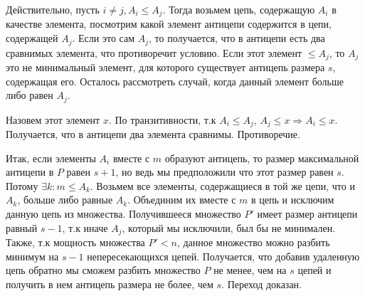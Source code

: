 {    Действительно, пусть $i \neq j, A_i \le A_j$. Тогда возьмем цепь, содержащую $A_i$ в качестве элемента, посмотрим какой элемент антицепи содержится в цепи, содержащей $A_j$. Если это сам $A_j$, то получается, что в антицепи есть два сравнимых элемента, что противоречит условию. Если этот элемент $\le A_j$, то $A_j$ это не минимальный элемент, для которого существует антицепь размера $s$, содержащая его. Осталось рассмотреть случай, когда данный элемент больше либо равен $A_j$.

    Назовем этот элемент $x$. По транзитивности, т.к $A_i \le A_j$, $A_j \le x \Rightarrow A_i \le x$. Получается, что в антицепи два элемента сравнимы. Противоречие.

    Итак, если элементы $A_i$ вместе с $m$ образуют антицепь, то размер максимальной антицепи в $P$ равен $s + 1$, но ведь мы предположили что этот размер равен $s$. Потому $\exists k: m \le A_k$. Возьмем все элементы, содержащиеся в той же цепи, что и $A_k$, больше либо равные $A_k$. Объединим их вместе с $m$ в цепь и исключим данную цепь из множества. Получившееся множество $P'$ имеет размер антицепи равный $s - 1$, т.к иначе $A_j$, который мы исключили, был бы не минимален. Также, т.к мощность множества $P' < n$, данное множество можно разбить минимум на $s - 1$ непересекающихся цепей. Получается, что добавив удаленную цепь обратно мы сможем разбить множество $P$ не менее, чем на $s$ цепей и получить в нем антицепь размера не более, чем $s$. Переход доказан.
}
